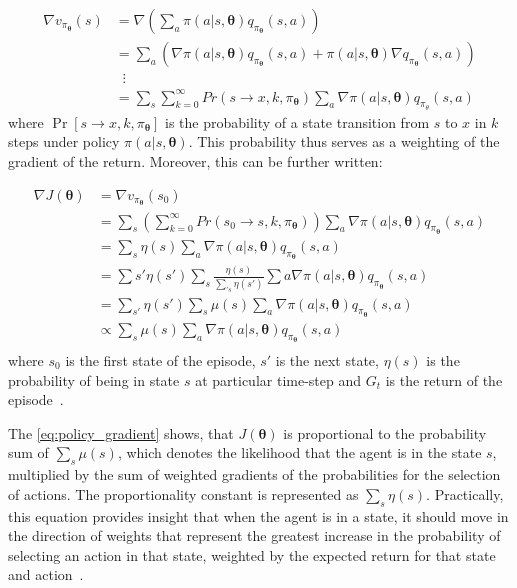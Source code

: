 \documentclass[../xlapes02]{subfiles}
\begin{document}
    \begin{equation}
        \begin{split}
            \nabla v_{\pi_{\bm{\theta}}}(s)&=\nabla\left(\sum_{a}\pi(a|s,\bm{\theta})q_{\pi_{\bm{\theta}}}(s,a)\right)\\
            &=\sum_{a}(\nabla\pi(a|s,\bm{\theta})q_{\pi_{\bm{\theta}}}(s,a)+\pi(a|s,\bm{\bm{\theta}})\nabla q_{\pi_{\bm{\theta}}}(s,a))\\
            &\mspace{10mu}\vdots\\
            &=\sum_{s}\sum_{k=0}^{\infty}Pr(s\rightarrow x,k,\pi_{\bm{\theta}})\sum_{a}\nabla\pi(a|s,\bm{\theta})q_{\pi_\theta}(s,a)
        \end{split}
    \end{equation}
    where $\Pr\left[s \rightarrow x, k, \pi_{\bm{\theta}}\right]$ is the probability of a state transition from $s$ to $x$ in $k$ steps under policy $\pi(a | s, \bm{\theta})$. This probability thus serves as a weighting of the gradient of the return. Moreover, this can be further written:

    \begin{equation}
        \label{eq:policy_gradient}
        \begin{split}
            \nabla J(\bm{\theta})&=\nabla v_{\pi_{\bm{\theta}}}(s_0)\\
            &=\sum_{s}\left(\sum_{k=0}^{\infty}Pr(s_0\rightarrow s,k,\pi_{\bm{\theta}})\right)\sum_{a}\nabla\pi(a|s,\bm{\theta})q_{\pi_{\bm{\theta}}}(s,a)\\
            &=\sum_{s}\eta(s)\sum_{a}\nabla\pi(a|s,\bm{\theta})q_{\pi_{\bm{\theta}}}(s,a)\\
            &=\sum{s'}\eta(s')\sum_{s}\frac{\eta(s)}{\sum_{'s}\eta(s')}\sum{a}\nabla\pi(a|s,\bm{\theta})q_{\pi_{\bm{\theta}}}(s,a)\\
            &=\sum_{s'}\eta(s')\sum_{s}\mu(s)\sum_{a}\nabla\pi(a|s,\bm{\theta})q_{\pi_{\bm{\theta}}}(s,a)\\
            &\propto\sum_{s}\mu(s)\sum_{a}\nabla\pi(a|s,\bm{\theta})q_{\pi_{\bm{\theta}}}(s,a)\\
        \end{split}
    \end{equation}
    where $s_0$ is the first state of the episode, $s'$ is the next state, $\eta(s)$ is the probability of being in state $s$ at particular time-step and $G_t$ is the return of the episode~\cite{sutton2018reinforcement, FITMT25127}.

    The \cref{eq:policy_gradient} shows, that $J(\bm{\theta})$ is proportional to the probability sum of $\sum_s \mu(s)$, which denotes the likelihood that the agent is in the state $s$, multiplied by the sum of weighted gradients of the probabilities for the selection of actions. The proportionality constant is represented as $\sum_s \eta(s)$. Practically, this equation provides insight that when the agent is in a state, it should move in the direction of weights that represent the greatest increase in the probability of selecting an action in that state, weighted by the expected return for that state and action~\cite{FITMT25127}.
\end{document}
